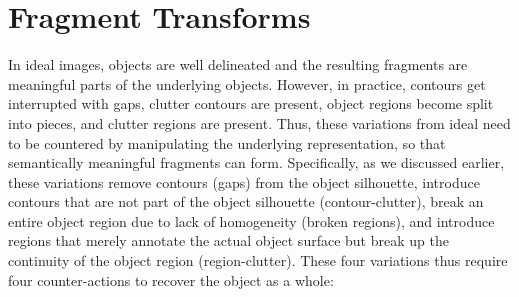 \section{Fragment Transforms}
\label{sec:transforms}

In ideal images, objects are well delineated and the resulting fragments are meaningful parts of the underlying objects. However, in practice, contours get interrupted with gaps, clutter contours are present, object regions become split into pieces, and clutter regions are present. Thus, these variations from ideal need to be countered by manipulating the underlying representation, so that semantically meaningful fragments can form. Specifically, as we discussed earlier, these variations remove contours (gaps) from the object silhouette, introduce contours that are not part of the object silhouette (contour-clutter), break an entire object region due to lack of homogeneity (broken regions), and introduce regions that merely annotate the actual object surface but break up the continuity of the object region (region-clutter). These four variations thus require four counter-actions to recover the object as a whole:


